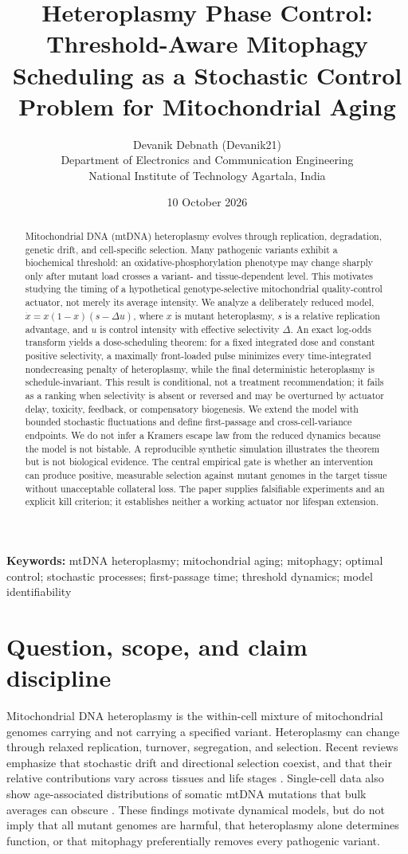 \documentclass[11pt]{article}
\title{Heteroplasmy Phase Control: Threshold-Aware Mitophagy Scheduling as a Stochastic Control Problem for Mitochondrial Aging}
\author{Devanik Debnath (Devanik21)\\\small Department of Electronics and Communication Engineering\\\small National Institute of Technology Agartala, India}
\date{10 October 2026}
\begin{document}
\maketitle
\begin{abstract}
Mitochondrial DNA (mtDNA) heteroplasmy evolves through replication, degradation, genetic drift, and cell-specific selection. Many pathogenic variants exhibit a biochemical threshold: an oxidative-phosphorylation phenotype may change sharply only after mutant load crosses a variant- and tissue-dependent level. This motivates studying the timing of a hypothetical genotype-selective mitochondrial quality-control actuator, not merely its average intensity. We analyze a deliberately reduced model, $\dot{x}=x(1-x)(s-\Delta u)$, where $x$ is mutant heteroplasmy, $s$ is a relative replication advantage, and $u$ is control intensity with effective selectivity $\Delta$. An exact log-odds transform yields a dose-scheduling theorem: for a fixed integrated dose and constant positive selectivity, a maximally front-loaded pulse minimizes every time-integrated nondecreasing penalty of heteroplasmy, while the final deterministic heteroplasmy is schedule-invariant. This result is conditional, not a treatment recommendation; it fails as a ranking when selectivity is absent or reversed and may be overturned by actuator delay, toxicity, feedback, or compensatory biogenesis. We extend the model with bounded stochastic fluctuations and define first-passage and cross-cell-variance endpoints. We do not infer a Kramers escape law from the reduced dynamics because the model is not bistable. A reproducible synthetic simulation illustrates the theorem but is not biological evidence. The central empirical gate is whether an intervention can produce positive, measurable selection against mutant genomes in the target tissue without unacceptable collateral loss. The paper supplies falsifiable experiments and an explicit kill criterion; it establishes neither a working actuator nor lifespan extension.
\end{abstract}

\noindent\textbf{Keywords:} mtDNA heteroplasmy; mitochondrial aging; mitophagy; optimal control; stochastic processes; first-passage time; threshold dynamics; model identifiability

\section{Question, scope, and claim discipline}
Mitochondrial DNA heteroplasmy is the within-cell mixture of mitochondrial genomes carrying and not carrying a specified variant. Heteroplasmy can change through relaxed replication, turnover, segregation, and selection. Recent reviews emphasize that stochastic drift and directional selection coexist, and that their relative contributions vary across tissues and life stages \cite{Ryall2026,Smith2024}. Single-cell data also show age-associated distributions of somatic mtDNA mutations that bulk averages can obscure \cite{Green2025}. These findings motivate dynamical models, but do not imply that all mutant genomes are harmful, that heteroplasmy alone determines function, or that mitophagy preferentially removes every pathogenic variant.
\end{document}
